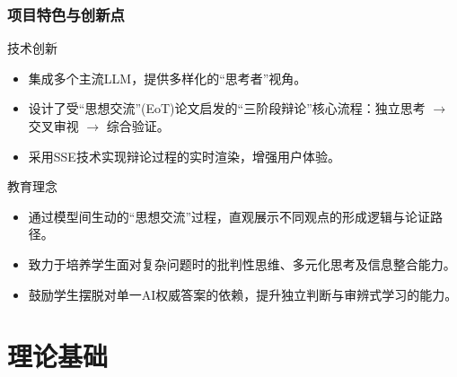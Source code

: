\documentclass[aspectratio=169]{beamer} %
\begin{document}
\begin{frame}
\frametitle{项目特色与创新点}
\begin{block}{技术创新}
\begin{itemize}
    \item 集成多个主流LLM，提供多样化的“思考者”视角。
    \item 设计了受“思想交流”(EoT)论文启发的“三阶段辩论”核心流程：独立思考 $\rightarrow$ 交叉审视 $\rightarrow$ 综合验证。
    \item 采用SSE技术实现辩论过程的实时渲染，增强用户体验。
\end{itemize}
\end{block}

\begin{block}{教育理念}
\begin{itemize}
    \item 通过模型间生动的“思想交流”过程，直观展示不同观点的形成逻辑与论证路径。
    \item 致力于培养学生面对复杂问题时的批判性思维、多元化思考及信息整合能力。
    \item 鼓励学生摆脱对单一AI权威答案的依赖，提升独立判断与审辨式学习的能力。
\end{itemize}
\end{block}
\end{frame}

\section{理论基础}
\end{document}

